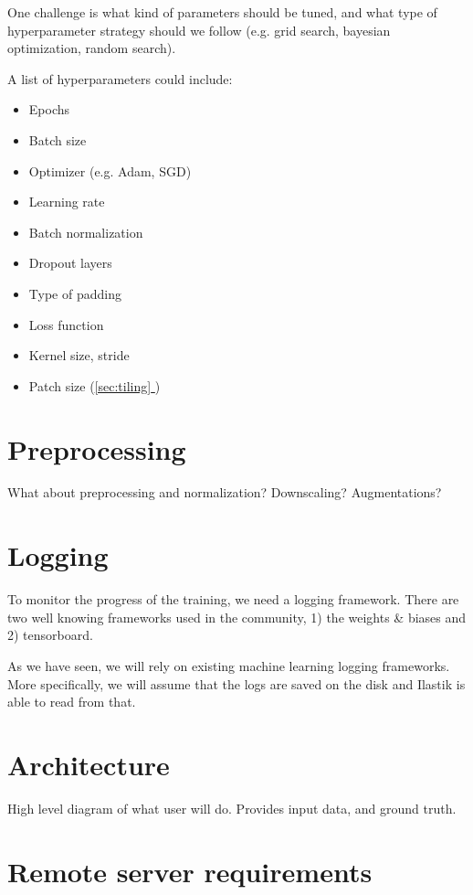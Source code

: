 \documentclass[12pt, a4paper]{article}
\newcommand*{\fullref}[1]{\hyperref[{#1}]{\ref*{#1} \nameref*{#1}}}
\begin{document}
One challenge is what kind of parameters should be tuned, and what type of hyperparameter strategy should we follow (e.g. grid search, bayesian optimization, random search).

A list of hyperparameters could include:
\begin{itemize}
    \itemsep -0.2em
    \item Epochs
    \item Batch size
    \item Optimizer (e.g. Adam, SGD)
    \item Learning rate
    \item Batch normalization
    \item Dropout layers
    \item Type of padding
    \item Loss function
    \item Kernel size, stride
    \item Patch size (\fullref{sec:tiling})
\end{itemize}



\section{Preprocessing}

What about preprocessing and normalization? Downscaling? Augmentations?


\section{Logging}

To monitor the progress of the training, we need a logging framework. There are two well knowing frameworks used in the community, 1) the weights \& biases and 2) tensorboard.


As we have seen, we will rely on existing machine learning logging frameworks. More specifically, we will assume that the logs are saved on the disk and Ilastik is able to read from that.


\section{Architecture}

High level diagram of what user will do. Provides input data, and ground truth.

\section{Remote server requirements}
\end{document}
